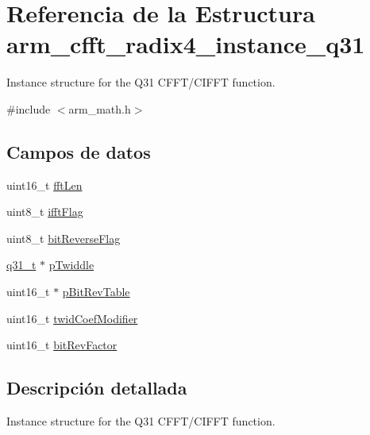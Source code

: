 \hypertarget{structarm__cfft__radix4__instance__q31}{}\section{Referencia de la Estructura arm\+\_\+cfft\+\_\+radix4\+\_\+instance\+\_\+q31}
\label{structarm__cfft__radix4__instance__q31}


Instance structure for the Q31 C\+F\+F\+T/\+C\+I\+F\+FT function.  




{\ttfamily \#include $<$arm\+\_\+math.\+h$>$}

\subsection*{Campos de datos}
\begin{DoxyCompactItemize}
\item 
uint16\+\_\+t \hyperlink{structarm__cfft__radix4__instance__q31_ab8db3bbe7c61e6bb8ca2a55e3446e11a}{fft\+Len}
\item 
uint8\+\_\+t \hyperlink{structarm__cfft__radix4__instance__q31_ad6ca6e223f986ebfd94c5ee1e410aa73}{ifft\+Flag}
\item 
uint8\+\_\+t \hyperlink{structarm__cfft__radix4__instance__q31_a09a221a818c6d0e064557a99e2fe9a8b}{bit\+Reverse\+Flag}
\item 
\hyperlink{arm__math_8h_adc89a3547f5324b7b3b95adec3806bc0}{q31\+\_\+t} $\ast$ \hyperlink{structarm__cfft__radix4__instance__q31_a2505b7d5ec077b244c712797a5253b6d}{p\+Twiddle}
\item 
uint16\+\_\+t $\ast$ \hyperlink{structarm__cfft__radix4__instance__q31_a46a2fb328199897af100fea0bfdf59aa}{p\+Bit\+Rev\+Table}
\item 
uint16\+\_\+t \hyperlink{structarm__cfft__radix4__instance__q31_afe772e5b5001c9d8e85032115a8df5bf}{twid\+Coef\+Modifier}
\item 
uint16\+\_\+t \hyperlink{structarm__cfft__radix4__instance__q31_a33386d95319dc3ee7097b3a8e52e01ec}{bit\+Rev\+Factor}
\end{DoxyCompactItemize}


\subsection{Descripción detallada}
Instance structure for the Q31 C\+F\+F\+T/\+C\+I\+F\+FT function. 

